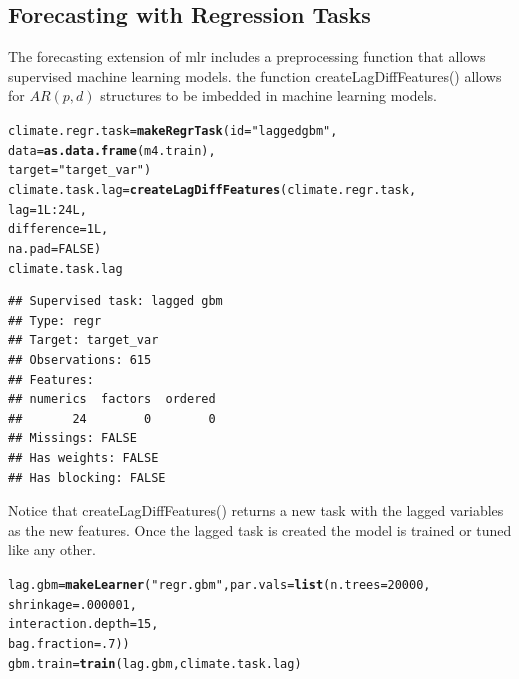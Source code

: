 \documentclass[12pt]{article}\usepackage[]{graphicx}\usepackage[]{color}
\makeatletter
\newcommand{\hlnum}[1]{\textcolor[rgb]{0.686,0.059,0.569}{#1}}%
\newcommand{\hlstr}[1]{\textcolor[rgb]{0.192,0.494,0.8}{#1}}%
\newcommand{\hlopt}[1]{\textcolor[rgb]{0,0,0}{#1}}%
\newcommand{\hlstd}[1]{\textcolor[rgb]{0.345,0.345,0.345}{#1}}%
\newcommand{\hlkwb}[1]{\textcolor[rgb]{0.69,0.353,0.396}{#1}}%
\newcommand{\hlkwc}[1]{\textcolor[rgb]{0.333,0.667,0.333}{#1}}%
\newcommand{\hlkwd}[1]{\textcolor[rgb]{0.737,0.353,0.396}{\textbf{#1}}}%
\newenvironment{kframe}{%
 \def\at@end@of@kframe{}%
 \ifinner\ifhmode%
  \def\at@end@of@kframe{\end{minipage}}%
  \begin{minipage}{\columnwidth}%
 \fi\fi%
 \def\FrameCommand##1{\hskip\@totalleftmargin \hskip-\fboxsep
 \colorbox{shadecolor}{##1}\hskip-\fboxsep
     \hskip-\linewidth \hskip-\@totalleftmargin \hskip\columnwidth}%
 \MakeFramed {\advance\hsize-\width
   \@totalleftmargin\z@ \linewidth\hsize
   \@setminipage}}%
 {\par\unskip\endMakeFramed%
 \at@end@of@kframe}
\newenvironment{knitrout}{}{} %
\theoremstyle{definition}
\newcommand\code{\@codex}
\def\@codex#1{{\normalfont\ttfamily\hyphenchar\font=-1 #1}}
\newcommand{\pkg}[1]{{\fontseries{b}\selectfont #1}}
\makeatother
\begin{document}
\subsection{Forecasting with Regression Tasks}
\label{sec:preprocAR}
The forecasting extension of \pkg{mlr} includes a preprocessing function that allows supervised machine learning models. the function \code{createLagDiffFeatures()} allows for $AR(p,d)$ structures to be imbedded in machine learning models.
\singlespacing
\begin{knitrout}
\color{fgcolor}\begin{kframe}
\begin{alltt}
\hlstd{climate.regr.task} \hlkwb{=} \hlkwd{makeRegrTask}\hlstd{(}\hlkwc{id} \hlstd{=} \hlstr{"lagged gbm"}\hlstd{,}
                                 \hlkwc{data} \hlstd{=} \hlkwd{as.data.frame}\hlstd{(m4.train),}
                                 \hlkwc{target} \hlstd{=} \hlstr{"target_var"}\hlstd{)}
\hlstd{climate.task.lag} \hlkwb{=} \hlkwd{createLagDiffFeatures}\hlstd{(climate.regr.task,}
                                         \hlkwc{lag} \hlstd{=} \hlnum{1L}\hlopt{:}\hlnum{24L}\hlstd{,}
                                         \hlkwc{difference} \hlstd{=} \hlnum{1L}\hlstd{,}
                                         \hlkwc{na.pad}\hlstd{=}\hlnum{FALSE}\hlstd{)}
\hlstd{climate.task.lag}
\end{alltt}
\begin{verbatim}
## Supervised task: lagged gbm
## Type: regr
## Target: target_var
## Observations: 615
## Features:
## numerics  factors  ordered 
##       24        0        0 
## Missings: FALSE
## Has weights: FALSE
## Has blocking: FALSE
\end{verbatim}
\end{kframe}
\end{knitrout}
\doublespacing

Notice that \code{createLagDiffFeatures()} returns a new task with the lagged variables as the new features. Once the lagged task is created the model is trained or tuned like any other.

\singlespacing
\begin{knitrout}
\color{fgcolor}\begin{kframe}
\begin{alltt}
\hlstd{lag.gbm} \hlkwb{=} \hlkwd{makeLearner}\hlstd{(}\hlstr{"regr.gbm"}\hlstd{,} \hlkwc{par.vals} \hlstd{=} \hlkwd{list}\hlstd{(}\hlkwc{n.trees} \hlstd{=} \hlnum{20000}\hlstd{,}
                                                  \hlkwc{shrinkage} \hlstd{=} \hlnum{.000001}\hlstd{,}
                                                  \hlkwc{interaction.depth} \hlstd{=} \hlnum{15}\hlstd{,}
                                                  \hlkwc{bag.fraction} \hlstd{=} \hlnum{.7}\hlstd{))}
\hlstd{gbm.train} \hlkwb{=} \hlkwd{train}\hlstd{(lag.gbm, climate.task.lag)}
\end{alltt}
\end{kframe}
\end{knitrout}
\doublespacing
\end{document}
